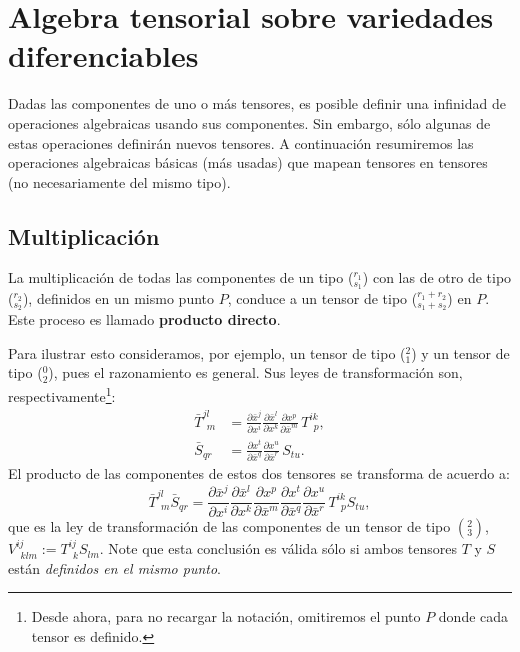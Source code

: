 \section{Algebra tensorial sobre variedades diferenciables}

Dadas las componentes de uno o más tensores, es posible definir una infinidad de operaciones algebraicas usando sus componentes. Sin embargo, sólo algunas de estas operaciones definirán nuevos tensores. A continuación resumiremos las operaciones algebraicas básicas (más usadas) que mapean tensores en tensores (no necesariamente del mismo tipo).


\subsection{Multiplicación}

La multiplicación de todas las componentes de un tipo ($_{s_1}^{r_1}$) con las de otro de tipo ($_{s_2}^{r_2}$), definidos en un mismo punto $P$, conduce a un tensor de
tipo ($_{s_1+s_2}^{r_1+r_2}$) en $P$. Este proceso es llamado
\textbf{producto directo}.

Para ilustrar esto consideramos, por ejemplo, un tensor de tipo ($_1^2$) y
un tensor de tipo ($_2^0$), pues el razonamiento es general. Sus leyes de
transformación son, respectivamente\footnote{Desde ahora, para no recargar la notación, omitiremos el punto $P$ donde cada tensor es definido.}:
\begin{align}
\bar{T}_{\ \ m}^{jl} & =\frac{\partial\bar{x}^j}{\partial x^i}\frac
{\partial\bar{x}^l}{\partial x^k}\frac{\partial x^p}{\partial\bar{x}
^m}\,T_{\ \ p}^{ik},\label{mul1}\\
\bar{S}_{qr} & =\frac{\partial x^{t}}{\partial\bar{x}^q}\frac{\partial
x^{u}}{\partial\bar{x}^r}\,S_{tu}.\nonumber
\end{align}
El producto de las componentes de estos dos tensores se transforma de acuerdo a:
\begin{equation}
\bar{T}_{\ \ m}^{jl}\bar{S}_{qr}=\frac{\partial\bar{x}^j}{\partial x^i
}\frac{\partial\bar{x}^l}{\partial x^k}\frac{\partial
x^p}{\partial\bar{x}^m}
\frac{\partial x^t}{\partial\bar{x}^q}\frac{\partial
x^{u}}{\partial\bar{x}^r}\,T_{\ \ p}^{ik}S_{tu}, \label{2}
\end{equation}
que es la ley de transformación de las componentes de un
tensor de tipo $(^2_3)$, $V_{\ \ klm}^{ij}:=T_{\ \ k}^{ij}S_{lm}$. Note que esta conclusión es válida sólo si ambos tensores $T$ y $S$ están \textit{definidos en el mismo punto}.

